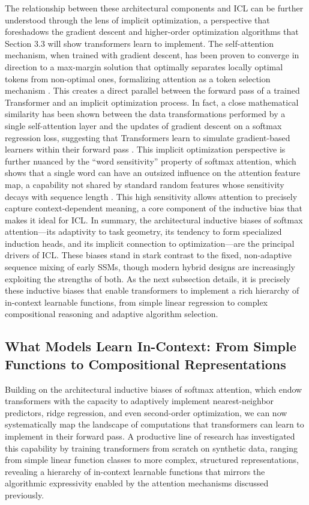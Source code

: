 \documentclass[11pt]{article}
\begin{document}
The relationship between these architectural components and ICL can be further understood through the lens of implicit optimization, a perspective that foreshadows the gradient descent and higher-order optimization algorithms that Section 3.3 will show transformers learn to implement. The self-attention mechanism, when trained with gradient descent, has been proven to converge in direction to a max-margin solution that optimally separates locally optimal tokens from non-optimal ones, formalizing attention as a token selection mechanism \cite{ref99}. This creates a direct parallel between the forward pass of a trained Transformer and an implicit optimization process. In fact, a close mathematical similarity has been shown between the data transformations performed by a single self-attention layer and the updates of gradient descent on a softmax regression loss, suggesting that Transformers learn to simulate gradient-based learners within their forward pass \cite{ref100}. This implicit optimization perspective is further nuanced by the ``word sensitivity'' property of softmax attention, which shows that a single word can have an outsized influence on the attention feature map, a capability not shared by standard random features whose sensitivity decays with sequence length \cite{ref101}. This high sensitivity allows attention to precisely capture context-dependent meaning, a core component of the inductive bias that makes it ideal for ICL. In summary, the architectural inductive biases of softmax attention---its adaptivity to task geometry, its tendency to form specialized induction heads, and its implicit connection to optimization---are the principal drivers of ICL. These biases stand in stark contrast to the fixed, non-adaptive sequence mixing of early SSMs, though modern hybrid designs are increasingly exploiting the strengths of both. As the next subsection details, it is precisely these inductive biases that enable transformers to implement a rich hierarchy of in-context learnable functions, from simple linear regression to complex compositional reasoning and adaptive algorithm selection.

\subsection{What Models Learn In-Context: From Simple Functions to Compositional Representations}

Building on the architectural inductive biases of softmax attention, which endow transformers with the capacity to adaptively implement nearest-neighbor predictors, ridge regression, and even second-order optimization, we can now systematically map the landscape of computations that transformers can learn to implement in their forward pass. A productive line of research has investigated this capability by training transformers from scratch on synthetic data, ranging from simple linear function classes to more complex, structured representations, revealing a hierarchy of in-context learnable functions that mirrors the algorithmic expressivity enabled by the attention mechanisms discussed previously.
\end{document}

